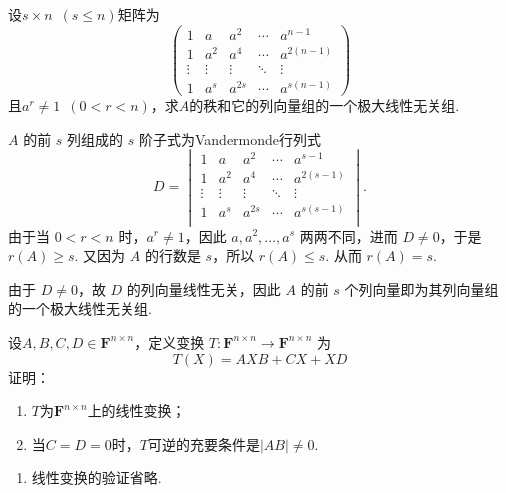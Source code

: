 \begin{exercise}
\begin{exgroup}
        \item 设$s \times n\enspace(s\leqslant n)$矩阵为
        \[\begin{pmatrix}
                1      & a      & a^2    & \cdots & a^{n-1}    \\
                1      & a^2    & a^4    & \cdots & a^{2(n-1)} \\
                \vdots & \vdots & \vdots & \ddots & \vdots     \\
                1      & a^s    & a^{2s} & \cdots & a^{s(n-1)}
            \end{pmatrix}\]
        且$a^r\neq 1\enspace(0<r<n)$，求$A$的秩和它的列向量组的一个极大线性无关组.
        \begin{answer}
            $A$ 的前 $s$ 列组成的 $s$ 阶子式为Vandermonde行列式
            \[D = \begin{vmatrix}
                    1      & a      & a^2    & \cdots & a^{s-1}    \\
                    1      & a^2    & a^4    & \cdots & a^{2(s-1)} \\
                    \vdots & \vdots & \vdots & \ddots & \vdots     \\
                    1      & a^s    & a^{2s} & \cdots & a^{s(s-1)} \\
                \end{vmatrix}.\]
            由于当 $0 < r < n$ 时，$a^r \neq 1$，因此 $a, a^2, \ldots, a^s$ 两两不同，进而 $D \neq 0$，于是 $r(A) \geqslant s$. 又因为 $A$ 的行数是 $s$，所以 $r(A) \leqslant s$. 从而 $r(A) = s$.

            由于 $D \neq 0$，故 $D$ 的列向量线性无关，因此 $A$ 的前 $s$ 个列向量即为其列向量组的一个极大线性无关组.
        \end{answer}

        \item 设$A,B,C,D \in \mathbf{F}^{n \times n}$，定义变换 $ T : \mathbf{F}^{n \times n} \to \mathbf{F}^{n \times n}$ 为
        \[ T(X) = AXB+CX+XD \]
        证明：
        \begin{enumerate}
            \item $T$为$\mathbf{F}^{n \times n}$上的线性变换；

            \item 当$C=D=0$时，$T$可逆的充要条件是$|AB| \neq 0$.
        \end{enumerate}
        \begin{answer}
            \begin{enumerate}
                \item 线性变换的验证省略.


\end{enumerate}
\end{answer}
\end{exgroup}
\end{exercise}
